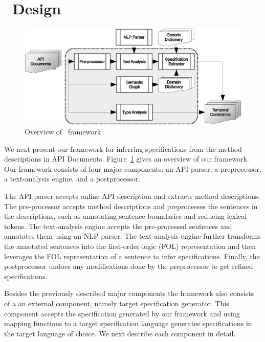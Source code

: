 \section{\tool\ Design}
\label{sec:approach}

\begin{figure}
	\centering
		\includegraphics[scale=0.45]{approach.eps}
	\caption{Overview of \tool\ framework}
	\label{fig:approachOverview}
\end{figure}

We next present our framework for inferring specifications from the method descriptions in API Documents.
Figure~\ref{fig:approachOverview} gives an overview of our framework.
Our framework consists of four major components: an API parser, a preprocessor, a text-analysis engine, and a postprocessor.

The API parser accepts online API description and extracts method descriptions.
The pre-processor accepts method descriptions and preprocesses the sentences in the descriptions, such as annotating sentence boundaries and reducing lexical tokens. 
The text-analysis engine accepts the pre-processed sentences and annotates them using an NLP parser.
The text-analysis engine further transforms the annotated sentences into the first-order-logic (FOL) representation and then leverages the FOL representation of a sentence to infer specifications.
Finally, the postprocessor undoes any modifications done by the preprocessor to get refined specifications.

Besides the previously described major components the framework also consists of a an external component, namely target specification generator.
This component accepts the specification generated by our framework and using mapping functions to a target specification language generates specifications in the target language of choice.
We next describe each component in detail.


